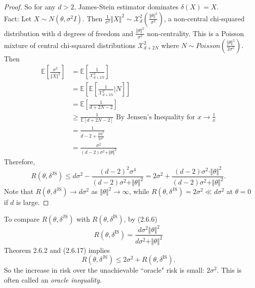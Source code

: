 \documentclass[a4paper]{article}
\begin{document}
\begin{proof}
	So for any $d > 2$, James-Stein estimator dominates $\delta(X)=X$.\\
	Fact: Let $X \sim N(\theta,\sigma^2I)$. Then $\frac{1}{\sigma^2} \Vert X \Vert^2 \sim \mathcal{X}_d^2\left(\frac{\Vert \theta \Vert^2}{\sigma^2}\right)$, a non-central chi-squared distribution with d degrees of freedom and $\frac{\Vert \theta \Vert^2}{\sigma^2}$ non-centrality. This is a Poisson mixture of central chi-squared distributions $\mathcal{X}^2_{d+2N}$ where $N \sim Poisson\left(\frac{\Vert \theta \Vert^2}{2\sigma^2}\right)$. Then
	\begin{equation}
		\begin{aligned}
			\mathbb{E}\left[\frac{\sigma^2}{\Vert X \Vert^2}\right] &= \mathbb{E}\left[\frac{1}{\mathcal{X}^2_{d+2N}}\right] \\
			&= \mathbb{E}\left[\mathbb{E}\left[\frac{1}{\mathcal{X}^2_{d+2N}}\bigg|N\right]\right] \\
			&= \mathbb{E}\left[\frac{1}{d+2N-2}\right] \\
			&\geq \frac{1}{\mathbb{E}[d+2N-2]} \text{ By Jensen's Inequality for } x \to \frac{1}{x} \\
			&= \frac{1}{d-2+ \frac{\Vert \theta \Vert^2}{2\sigma^2}} \\
			&= \frac{\sigma^2}{(d-2)\sigma^2 + \Vert \theta \Vert^2} 
		\end{aligned}
	\end{equation}
	Therefore,
	\begin{equation}
		R(\theta,\delta^{\text{JS}}) \leq d\sigma^2  - \frac{(d-2)^2\sigma^4}{(d-2)\sigma^2 + \Vert \theta \Vert^2} = 2\sigma^2 + \frac{(d-2) \sigma^2 \cdot \Vert \theta \Vert ^2}{(d-2) \sigma^2 + \Vert \theta \Vert ^2}.
	\end{equation}
	Note that $R(\theta,\delta^{\text{JS}}) \to d\sigma^2$ as $\Vert \theta \Vert^2 \to \infty$, while $R(\theta,\delta^{\text{JS}}) = 2\sigma^2 \ll d\sigma^2 $ at $\theta = 0$ if $d$ is large.
\end{proof}

\begin{remark}
	To compare $R(\theta,\delta^{\text{JS}})$ with $R(\theta,\delta^{\text{IS}})$, by (2.6.6) 
	\begin{equation}
		R(\theta,\delta^{\text{IS}}) = \frac{d\sigma^2\Vert \theta \Vert^2}{d\sigma^2 + \Vert \theta \Vert^2}
	\end{equation}
	Theorem 2.6.2 and (2.6.17) implies
	\begin{equation}
		R(\theta,\delta^{\text{JS}}) \leq 2\sigma^2 + R(\theta,\delta^{\text{IS}}).
	\end{equation}
	So the increase in risk over the unachievable ``oracle" risk is small: $2\sigma^2$. This is often called an \emph{oracle inequality}.
\end{remark}
\end{document}
